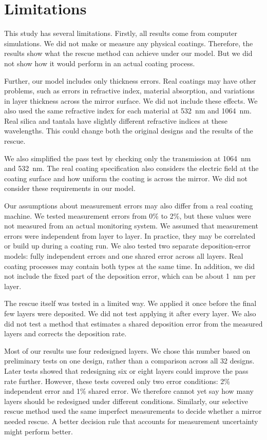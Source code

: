 \section{Limitations}
\label{sec:limitations}

This study has several limitations. Firstly, all results come from computer simulations. We did not make or measure any physical coatings. Therefore, the results show what the rescue method can achieve under our model. But we did not show how it would perform in an actual coating process.

Further, our model includes only thickness errors. Real coatings may have other problems, such as errors in refractive index, material absorption, and variations in layer thickness across the mirror surface. We did not include these effects. We also used the same refractive index for each material at 532~nm and 1064~nm. Real silica and tantala have slightly different refractive indices at these wavelengths. This could change both the original designs and the results of the rescue.

We also simplified the pass test by checking only the transmission at 1064~nm and 532~nm. The real coating specification also considers the electric field at the coating surface and how uniform the coating is across the mirror. We did not consider these requirements in our model.

Our assumptions about measurement errors may also differ from a real coating machine. We tested measurement errors from 0\% to 2\%, but these values were not measured from an actual monitoring system. We assumed that measurement errors were independent from layer to layer. In practice, they may be correlated or build up during a coating run. We also tested two separate deposition-error models: fully independent errors and one shared error across all layers. Real coating processes may contain both types at the same time. In addition, we did not include the fixed part of the deposition error, which can be about 1~nm per layer.

The rescue itself was tested in a limited way. We applied it once before the final few layers were deposited. We did not test applying it after every layer. We also did not test a method that estimates a shared deposition error from the measured layers and corrects the deposition rate.

Most of our results use four redesigned layers. We chose this number based on preliminary tests on one design, rather than a comparison across all 32 designs. Later tests showed that redesigning six or eight layers could improve the pass rate further. However, these tests covered only two error conditions: 2\% independent error and 1\% shared error. We therefore cannot yet say how many layers should be redesigned under different conditions. Similarly, our selective rescue method used the same imperfect measurements to decide whether a mirror needed rescue. A better decision rule that accounts for measurement uncertainty might perform better.

